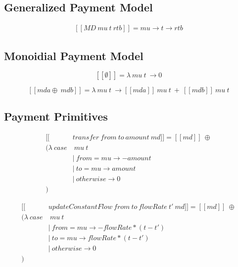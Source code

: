 \documentclass[a4paper,10pt]{report}
\begin{document}
\subsection{Generalized Payment Model}

\begin{equation}\label{sem_transfer}
    \begin{split}
        [\![MD\ mu\ t\ rtb]\!] = mu \rightarrow t \rightarrow rtb
    \end{split}
\end{equation}

\subsection{Monoidial Payment Model}

\begin{equation}\label{sem_mzero}
    [\![\emptyset]\!] = \lambda\ mu\ t\ \rightarrow 0
\end{equation}

\begin{equation}\label{sem_mappend}
    [\![mda \oplus\ mdb]\!] = \lambda\ mu\ t\ \rightarrow
    [\![mda]\!]\ mu\ t\ +\ [\![mdb]\!]\ mu\ t
\end{equation}

\subsection{Payment Primitives}

\begin{equation}\label{sem_transfer}
    \begin{split}
        [\![&transfer\ from\ to\ amount\ md]\!] = [\![md]\!]\ \oplus \\
        (\lambda\ case&\ mu\ t \\
        &|\ from = mu \rightarrow -amount \\
        &|\ to   = mu \rightarrow amount \\
        &|\ otherwise \rightarrow 0 \\
        )
    \end{split}
\end{equation}

\begin{equation}\label{sem_updateConstantFlow}
    \begin{split}
        [\![&updateConstantFlow\ from\ to\ flowRate\ t'\ md]\!] = [\![md]\!]\ \oplus \\
        (\lambda\ case&\ mu\ t \\
        &|\ from = mu \rightarrow -flowRate * (t - t') \\
        &|\ to   = mu \rightarrow flowRate  * (t - t') \\
        &|\ otherwise \rightarrow 0 \\
        )
    \end{split}
\end{equation}
\end{document}
